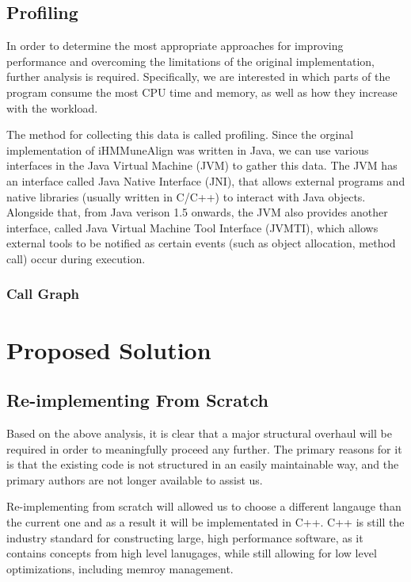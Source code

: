 \documentclass[a4paper,12pt]{report}
\begin{document}
\section{Profiling}
In order to determine the most appropriate approaches for improving performance and overcoming the limitations of the original implementation, further analysis is required. Specifically, we are interested in which parts of the program consume the most CPU time and memory, as well as how they increase with the workload.

The method for collecting this data is called profiling. Since the orginal implementation of iHMMuneAlign was written in Java, we can use various interfaces in the Java Virtual Machine (JVM) to gather this data. The JVM has an interface called Java Native Interface (JNI)\autocite{jni}, that allows external programs and native libraries (usually written in C/C++) to interact with Java objects. Alongside that, from Java verison 1.5 onwards, the JVM also provides another interface, called Java Virtual Machine Tool Interface (JVMTI)\autocite{jvmti}, which allows external tools to be notified as certain events (such as object allocation, method call) occur during execution.

\subsection{Call Graph}

\chapter{Proposed Solution}

\section{Re-implementing From Scratch}
Based on the above analysis, it is clear that a major structural overhaul will be required in order to meaningfully proceed any further. The primary reasons for it is that the existing code is not structured in an easily maintainable way, and the primary authors are not longer available to assist us. 

Re-implementing from scratch will allowed us to choose a different langauge than the current one and as a result it will be implementated in C++. C++ is still the industry standard for constructing large, high performance software\autocite{cpp}, as it contains concepts from high level lanugages, while still allowing for low level optimizations, including memroy management. 
\end{document}
